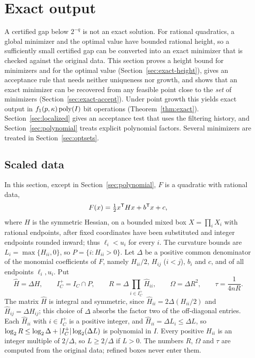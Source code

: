 \section{Exact output}\label{sec:exact}

A certified gap below $2^{-q}$ is not an exact solution. For rational
quadratics, a global minimizer and the optimal value have bounded rational
height, so a sufficiently small certified gap can be converted into an exact
minimizer that is checked against the original data. This section proves a
height bound for minimizers and for the optimal value
(Section~\ref{sec:exact-height}), gives an acceptance rule that needs neither
uniqueness nor growth, and shows that an exact minimizer can be recovered from
any feasible point close to the \emph{set} of minimizers
(Section~\ref{sec:exact-accept}). Under point growth this yields exact output
in $f_1(p,\kappa)\operatorname{poly}(I)$ bit operations (Theorem~\ref{thm:exact}).
Section~\ref{sec:localized} gives an acceptance test that uses the filtering
history, and Section~\ref{sec:polynomial} treats explicit polynomial factors.
Several minimizers are treated in Section~\ref{sec:optsets}.

\subsection{Scaled data}\label{sec:exact-data}

In this section, except in Section~\ref{sec:polynomial}, $F$ is a quadratic
with rational data,
\[
F(x)=\tfrac12x^{\mathsf T}Hx+b^{\mathsf T}x+c ,
\]
where $H$ is the symmetric Hessian, on a bounded mixed box
$X=\prod_iX_i$ with rational endpoints, after fixed coordinates have been
substituted and integer endpoints rounded inward; thus $\ell_i<u_i$ for every
$i$. The curvature bounds are $L_i=\max\{H_{ii},0\}$, so
$P=\{i:H_{ii}>0\}$. Let $\Delta$ be a positive common denominator of the
monomial coefficients of $F$, namely $H_{ii}/2$, $H_{ij}$ ($i<j$), $b_i$ and
$c$, and of all endpoints $\ell_i,u_i$. Put
\begin{equation}\label{eq:exact-constants}
\hat H=\Delta H,\qquad I_C^+=I_C\cap P,\qquad
R=\Delta\prod_{i\in I_C^+}\hat H_{ii},\qquad \Omega=\Delta R^2,\qquad
\tau=\frac1{4nR}.
\end{equation}
The matrix $\hat H$ is integral and symmetric, since
$\hat H_{ii}=2\Delta(H_{ii}/2)$ and $\hat H_{ij}=\Delta H_{ij}$; this choice of
$\Delta$ absorbs the factor two of the off-diagonal entries. Each
$\hat H_{ii}$ with $i\in I_C^+$ is a positive integer, and
$\hat H_{ii}=\Delta L_i\le\Delta L$, so
$\log_2R\le\log_2\Delta+\lvert I_C^+\rvert\log_2(\Delta L)$ is polynomial in $I$.
Every positive $H_{ii}$ is an integer multiple of $2/\Delta$, so $L\ge2/\Delta$
if $L>0$. The numbers $R$, $\Omega$ and $\tau$ are computed from the original
data; refined boxes never enter them.

